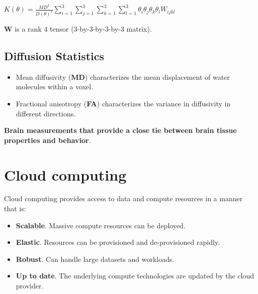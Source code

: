 \documentclass[a0, landscape]{a0poster}
\begin{document}
\begin{multicols}{3}
\begin{center}
\begin{large}
$K(\theta)=\frac{MD^{2}}{D(\theta)^{2}}\sum_{i=1}^{3}\sum_{j=1}^{3}\sum_{k=1}^{3} \sum_{l=1}^{3}\theta_{i}\theta_{j}\theta_{k}\theta_{l}W_{ijkl}$

\vspace{2mm}
\end{large}
\end{center}

$\mathbf{W}$ is a rank 4 tensor (3-by-3-by-3-by-3 matrix).

\vspace{-2mm}
\subsection*{Diffusion Statistics}

\begin{itemize}

\item Mean diffusivity (\textbf{MD}) characterizes the mean displacement of
water molecules within a voxel.

\item Fractional anisotropy (\textbf{FA}) characterizes the variance in
diffusivity in different directions.

\end{itemize}

\large

\noindent \textbf{Brain measurements that provide a close tie between brain tissue properties and behavior}.

\vfill
\columnbreak

\color{Navy}

\section*{Cloud computing}

Cloud computing provides access to data and compute resources in a manner that is:

\begin{itemize}
\item{{\bf Scalable}. Massive compute resources can be deployed.}
\item{{\bf Elastic}. Resources can be provisioned and de-provisioned rapidly.}
\item{{\bf Robust}. Can handle large datasets and workloads.}
\item{{\bf Up to date}. The underlying compute technologies are updated by the cloud provider.}
\end{itemize}


\end{multicols}
\end{document}
